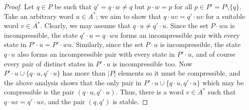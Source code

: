 \documentclass{irmaart}
\theoremstyle{plain}
\begin{document}
\begin{proof}
Let $q\in P$ be such that $q'=q\cdot w\ne q$ but $p\cdot w=p$ for all $p\in
P'=P\setminus\{q\}$. Take an arbitrary word $u\in A^*$; we aim to show that
$q\cdot uv=q'\cdot uv$ for a suitable word $v\in A^*$. Clearly, we may assume
that $q\cdot u\ne q'\cdot u$. Since the set $P\cdot wu$ is incompressible, the
state $q'\cdot u=q\cdot wu$ forms an incompressible pair with every state in
$P'\cdot u=P'\cdot wu$. Similarly, since the set $P\cdot u$ is incompressible,
the state $q\cdot u$ also forms an incompressible pair with every state in
$P'\cdot u$, and of course every pair of distinct states in $P'\cdot u$ is
incompressible too. Now $P'\cdot u\cup\{q\cdot u,q'\cdot u\}$ has more than
$|P|$ elements so it must be compressible, and the above analysis shows that
the only pair in $P'\cdot u\cup\{q\cdot u,q'\cdot u\}$ which may be
compressible is the pair $(q\cdot u,q'\cdot u)$. Thus, there is a word $v\in
A^*$ such that $q\cdot uv=q'\cdot uv$, and the pair $(q,q')$ is stable.
\end{proof}
\end{document}
